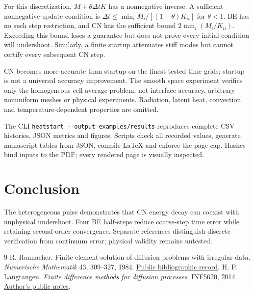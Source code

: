\documentclass[11pt,a4paper]{article}
\begin{document}
For this discretization, $M+\theta\Delta tK$ has a nonnegative inverse.
A sufficient nonnegative-update condition is
$\Delta t\leq\min_i M_i/[(1-\theta)K_{ii}]$ for $\theta<1$.
BE has no such step restriction, and CN has the sufficient bound
$2\min_i(M_i/K_{ii})$. Exceeding this bound loses a guarantee but does not
prove every initial condition will undershoot. Similarly, a finite startup
attenuates stiff modes but cannot certify every subsequent CN step.

CN becomes more accurate than startup on the finest tested time grids;
startup is not a universal accuracy improvement. The smooth space experiment
verifies only the homogeneous cell-average problem, not interface accuracy,
arbitrary nonuniform meshes or physical experiments. Radiation, latent heat,
convection and temperature-dependent properties are omitted.

The CLI \texttt{heatstart -{}-output examples/results} reproduces complete CSV
histories, JSON metrics and figures. Scripts check all recorded values,
generate manuscript tables from JSON, compile LaTeX and enforce the page
cap. Hashes bind inputs to the PDF; every rendered page is visually inspected.

\section{Conclusion}
The heterogeneous pulse demonstrates that CN energy decay can coexist with
unphysical undershoot. Four BE half-steps reduce coarse-step time error while
retaining second-order convergence. Separate references distinguish discrete
verification from continuum error; physical validity remains untested.

\begin{thebibliography}{9}\small
{} R. Rannacher. Finite element solution of diffusion problems
with irregular data. \emph{Numerische Mathematik} 43, 309--327, 1984.
\href{https://eudml.org/doc/132904}{Public bibliographic record}.
 H. P. Langtangen. \emph{Finite difference methods for
diffusion processes}. INF5620, 2014.
\href{https://hplgit.github.io/INF5620/doc/pub/H14/diffu/html/._main_diffu001.html}{Author's public notes}.
\end{thebibliography}
\end{document}
